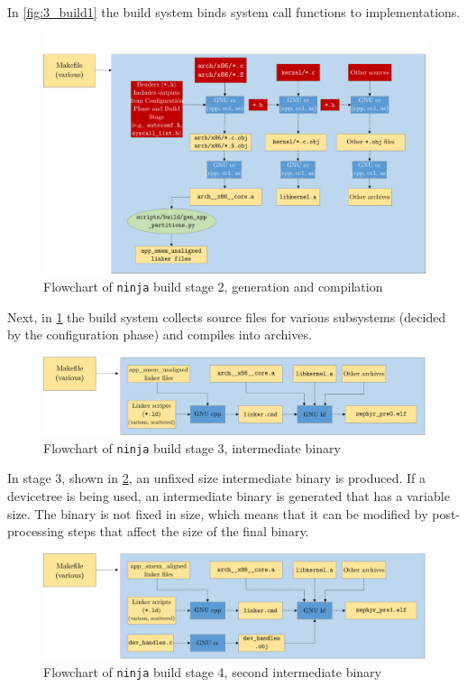 In \cref{fig:3_build1} the build system binds system call functions to implementations.
\begin{figure}[htbp]
	\centering
	\includegraphics[width=\textwidth]{Figures/3_cmake_build2.pdf}
	\caption[Flowchart of ninja stage 2, generation and compilation]{Flowchart of \texttt{ninja} build stage 2, generation and compilation\cite{zephyrprojectdocumentation}}
	\label{fig:3_build2}
\end{figure}
Next, in \cref{fig:3_build2} the build system collects source files for various subsystems (decided by the configuration phase) and compiles into archives.
\begin{figure}[htbp]
	\centering
	\includegraphics[width=\textwidth]{Figures/3_cmake_build3.pdf}
	\caption[Flowchart of ninja stage 3, intermediate binary]{Flowchart of \texttt{ninja} build stage 3, intermediate binary\cite{zephyrprojectdocumentation}}
	\label{fig:3_build3}
\end{figure}
In stage 3, shown in \cref{fig:3_build3}, an unfixed size intermediate binary is produced. If a devicetree is being used, an intermediate binary is generated that has a variable size. The binary is not fixed in size, which means that it can be modified by post-processing steps that affect the size of the final binary.
\begin{figure}[htbp]
	\centering
	\includegraphics[width=\textwidth]{Figures/3_cmake_build4.pdf}
	\caption[Flowchart of ninja stage 4, second intermediate binary]{Flowchart of \texttt{ninja} build stage 4, second intermediate binary\cite{zephyrprojectdocumentation}}
	\label{fig:3_build4}
\end{figure}
